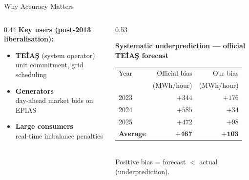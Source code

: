 \documentclass[10pt,aspectratio=169]{beamer}
\begin{document}
\begin{frame}{Why Accuracy Matters}
  \begin{columns}
    \begin{column}{0.44\textwidth}
      \textbf{Key users (post-2013 liberalisation):}
      \vspace{0.4em}
      \begin{itemize}
        \item \textbf{TEİAŞ} (system operator)\\
              {\small unit commitment, grid scheduling}
        \item \textbf{Generators}\\
              {\small day-ahead market bids on EPIAS}
        \item \textbf{Large consumers}\\
              {\small real-time imbalance penalties}
      \end{itemize}
    \end{column}
    \begin{column}{0.53\textwidth}
      \begin{center}
        \textbf{Systematic underprediction --- official TEİAŞ forecast}\\[0.5em]
        \small
        \begin{tabular}{lrr}
          \toprule
          Year & Official bias & Our bias \\
               & (MWh/hour)    & (MWh/hour) \\
          \midrule
          2023 & $+344$ & $+176$ \\
          2024 & $+585$ & $+34$  \\
          2025 & $+472$ & $+98$  \\
          \midrule
          \textbf{Average} & $\mathbf{+467}$ & $\mathbf{+103}$ \\
          \bottomrule
        \end{tabular}\\[0.4em]
        \small Positive bias = forecast $<$ actual (underprediction).
      \end{center}
    \end{column}
  \end{columns}
\end{frame}
\end{document}
